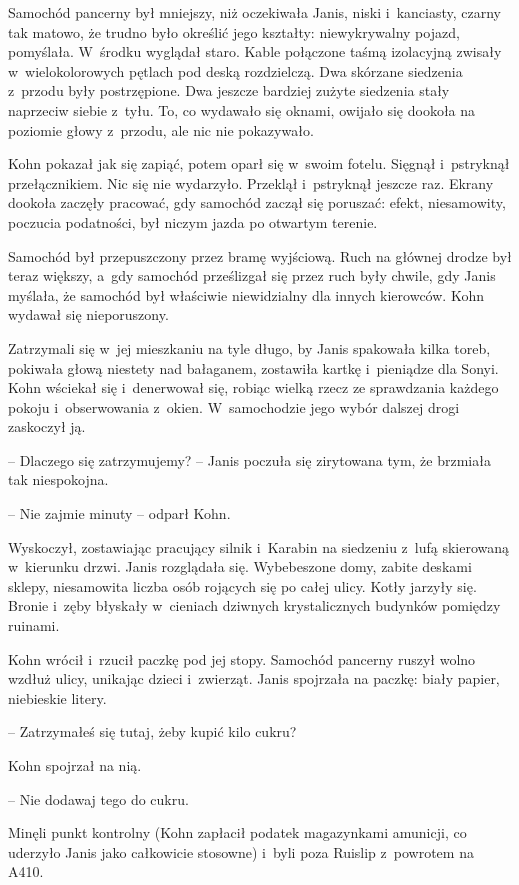 \documentclass[oneside,polish,11pt,sfheadings]{mwbk}
\begin{document}
Samochód pancerny był mniejszy, niż oczekiwała Janis, niski i~kanciasty,
czarny tak matowo, że trudno było określić jego kształty: niewykrywalny
pojazd, pomyślała. W~środku wyglądał staro. Kable połączone taśmą
izolacyjną zwisały w~wielokolorowych pętlach pod deską rozdzielczą. Dwa
skórzane siedzenia z~przodu były postrzępione. Dwa jeszcze bardziej
zużyte siedzenia stały naprzeciw siebie z~tyłu. To, co wydawało się
oknami, owijało się dookoła na poziomie głowy z~przodu, ale nic nie
pokazywało.

Kohn pokazał jak się zapiąć, potem oparł się w~swoim fotelu. Sięgnął i~pstryknął przełącznikiem. Nic się nie wydarzyło. Przeklął i~pstryknął
jeszcze raz. Ekrany dookoła zaczęły pracować, gdy samochód zaczął się
poruszać: efekt, niesamowity, poczucia podatności, był niczym jazda po
otwartym terenie.

Samochód był przepuszczony przez bramę wyjściową. Ruch na głównej drodze
był teraz większy, a~gdy samochód prześlizgał się przez ruch były
chwile, gdy Janis myślała, że samochód był właściwie niewidzialny dla
innych kierowców. Kohn wydawał się nieporuszony.

Zatrzymali się w~jej mieszkaniu na tyle długo, by Janis spakowała kilka
toreb, pokiwała głową niestety nad bałaganem, zostawiła kartkę i~pieniądze dla Sonyi. Kohn wściekał się i~denerwował się, robiąc wielką
rzecz ze sprawdzania każdego pokoju i~obserwowania z~okien. W~samochodzie jego wybór dalszej drogi zaskoczył ją.

-- Dlaczego się zatrzymujemy? -- Janis poczuła się zirytowana tym, że
brzmiała tak niespokojna.

-- Nie zajmie minuty -- odparł Kohn.

Wyskoczył, zostawiając pracujący silnik i~Karabin na siedzeniu z~lufą
skierowaną w~kierunku drzwi. Janis rozglądała się. Wybebeszone domy,
zabite deskami sklepy, niesamowita liczba osób rojących się po całej
ulicy. Kotły jarzyły się. Bronie i~zęby błyskały w~cieniach dziwnych
krystalicznych budynków pomiędzy ruinami.

Kohn wrócił i~rzucił paczkę pod jej stopy. Samochód pancerny ruszył
wolno wzdłuż ulicy, unikając dzieci i~zwierząt. Janis spojrzała na
paczkę: biały papier, niebieskie litery.

-- Zatrzymałeś się tutaj, żeby kupić kilo cukru?

Kohn spojrzał na nią. 

-- Nie dodawaj tego do cukru.

Minęli punkt kontrolny (Kohn zapłacił podatek magazynkami amunicji, co
uderzyło Janis jako całkowicie stosowne) i~byli poza Ruislip z~powrotem
na A410.
\end{document}
